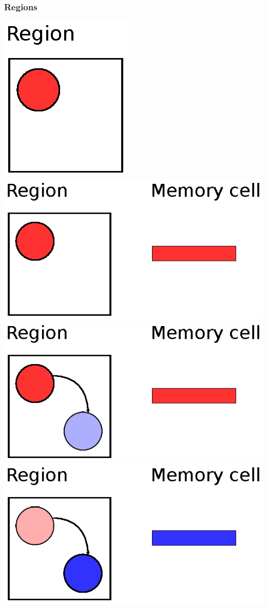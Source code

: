 \documentclass{beamer}
\begin{document}
\begin{frame}
  \frametitle{Regions}
  \begin{overprint}
    \includegraphics[trim=5px 5px 5px 5px]{region1.eps}
    \includegraphics[trim=5px 5px 5px 5px]{region2.eps}
    \includegraphics[trim=5px 5px 5px 5px]{region3.eps}
    \includegraphics[trim=5px 5px 5px 5px]{region4.eps}

\end{overprint}
\end{frame}
\end{document}
